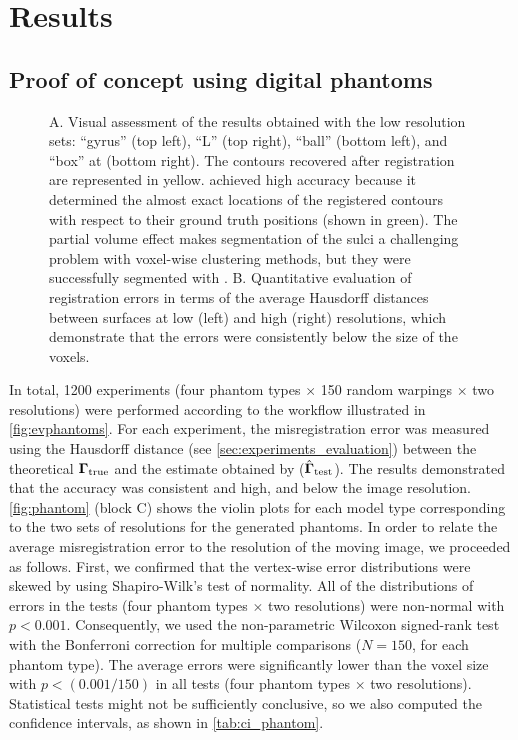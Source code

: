 \section{Results}
\label{sec:results}

\subsection{Proof of concept using digital phantoms}
\label{sec:results_phantom}

\begin{figure*}
  \centering
  
  \caption{A. Visual assessment of the results obtained with the low resolution sets:
    ``gyrus'' (top left), ``L'' (top right), ``ball'' (bottom left),
    and ``box'' at (bottom right).
  The contours recovered after registration are represented in yellow.
  \Regseg{} achieved high accuracy because it determined the almost exact locations of the registered
    contours with respect to their ground truth positions (shown in green).
  The partial volume effect makes segmentation of the sulci a challenging problem with voxel-wise
    clustering methods, but they were successfully segmented with \regseg{}.
  B. Quantitative evaluation of registration errors in terms of the average Hausdorff distances between
    surfaces at low (left) and high (right) resolutions, which demonstrate that the errors were
    consistently below the size of the voxels.
    }\label{fig:phantom}
\end{figure*}
In total, 1200 experiments (four phantom types $\times$ 150 random warpings $\times$ two resolutions) were
  performed according to the workflow illustrated in \autoref{fig:evphantoms}.
For each experiment, the misregistration error was measured using the Hausdorff distance
  (see \autoref{sec:experiments_evaluation}) between the theoretical $\boldsymbol{\Gamma}_\text{true}$ and
  the estimate obtained by \regseg{} ($\hat{\boldsymbol{\Gamma}}_\text{test}$).
The results demonstrated that the accuracy was consistent and high, and below the image resolution.
\autoref{fig:phantom} (block C) shows the violin plots for each model type corresponding
  to the two sets of resolutions for the generated phantoms.
In order to relate the average misregistration error to the resolution of the moving image,
  we proceeded as follows.
First, we confirmed that the vertex-wise error distributions were skewed by using Shapiro-Wilk's test of
  normality.
All of the distributions of errors in the tests (four phantom types $\times$ two resolutions) were
  non-normal with $p<0.001$.
Consequently, we used the non-parametric Wilcoxon signed-rank test with the Bonferroni
  correction for multiple comparisons ($N=150$, for each phantom type).
The average errors were significantly lower than the voxel size with $p < (0.001 / 150)$
  in all tests (four phantom types $\times$ two resolutions).
Statistical tests might not be sufficiently conclusive, so we also computed the confidence intervals,
  as shown in \autoref{tab:ci_phantom}.


